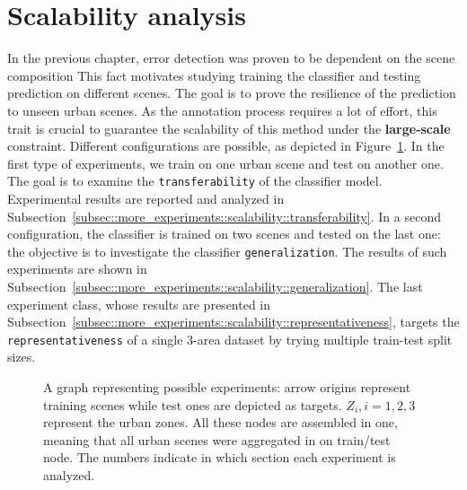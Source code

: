 \minitoc

\vfill

\clearpage

\section{Scalability analysis}
    \label{sec::more_experiments::scalability}
    In the previous chapter, error detection was proven to be dependent on the scene composition
    This fact motivates studying training the classifier and testing prediction on different scenes.
    The goal is to prove the resilience of the prediction to unseen urban scenes.
    As the annotation process requires a lot of effort, this trait is crucial to guarantee the scalability of this method under the \textbf{large-scale} constraint.
    Different configurations are possible, as depicted in Figure~\ref{fig::scalability_study}.
    In the first type of experiments, we train on one urban scene and test on another one.
    The goal is to examine the \texttt{transferability} of the classifier model.
    Experimental results are reported and analyzed in Subsection~\ref{subsec::more_experiments::scalability::transferability}.
    In a second configuration, the classifier is trained on two scenes and tested on the last one: the objective is to investigate the classifier \texttt{generalization}.
    The results of such experiments are shown in Subsection~\ref{subsec::more_experiments::scalability::generalization}.
    The last experiment class, whose results are presented in Subsection~\ref{subsec::more_experiments::scalability::representativeness}, targets the \texttt{representativeness} of a single 3-area dataset by trying multiple train-test split sizes.

    \begin{figure}[htbp]
        \ffigbox[\FBwidth]{
            
        }
        {
            \caption{
                \label{fig::scalability_study}
                A graph representing possible experiments: arrow origins represent training scenes while test ones are depicted as targets.
                \(Z_i, i=1,2,3\) represent the urban zones.
                All these nodes are assembled in one, meaning that all urban scenes were aggregated in on train/test node.
                The numbers indicate in which section each experiment is analyzed.
            }
        }
    \end{figure}


